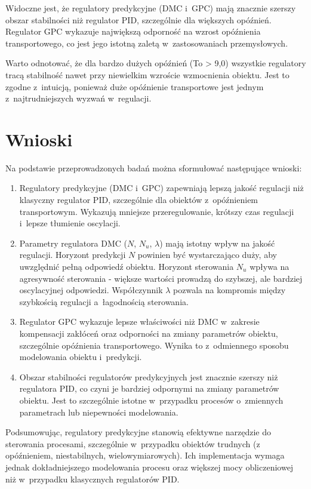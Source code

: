\documentclass[a4paper,titlepage,11pt,floatssmall]{mwrep}
\begin{document}
Widoczne jest, że regulatory predykcyjne (DMC i~GPC) mają znacznie szerszy obszar stabilności niż regulator PID, szczególnie dla większych opóźnień. Regulator GPC wykazuje największą odporność na wzrost opóźnienia transportowego, co jest jego istotną zaletą w~zastosowaniach przemysłowych.

Warto odnotować, że dla bardzo dużych opóźnień (To > 9,0) wszystkie regulatory tracą stabilność nawet przy niewielkim wzroście wzmocnienia obiektu. Jest to zgodne z~intuicją, ponieważ duże opóźnienie transportowe jest jednym z~najtrudniejszych wyzwań w~regulacji.

\chapter{Wnioski}

Na podstawie przeprowadzonych badań można sformułować następujące wnioski:

\begin{enumerate}
    \item Regulatory predykcyjne (DMC i~GPC) zapewniają lepszą jakość regulacji niż klasyczny regulator PID, szczególnie dla obiektów z~opóźnieniem transportowym. Wykazują mniejsze przeregulowanie, krótszy czas regulacji i~lepsze tłumienie oscylacji.

    \item Parametry regulatora DMC ($N$, $N_u$, $\lambda$) mają istotny wpływ na jakość regulacji. Horyzont predykcji $N$ powinien być wystarczająco duży, aby uwzględnić pełną odpowiedź obiektu. Horyzont sterowania $N_u$ wpływa na agresywność sterowania - większe wartości prowadzą do szybszej, ale bardziej oscylacyjnej odpowiedzi. Współczynnik $\lambda$ pozwala na kompromis między szybkością regulacji a~łagodnością sterowania.

    \item Regulator GPC wykazuje lepsze właściwości niż DMC w~zakresie kompensacji zakłóceń oraz odporności na zmiany parametrów obiektu, szczególnie opóźnienia transportowego. Wynika to z~odmiennego sposobu modelowania obiektu i~predykcji.

    \item Obszar stabilności regulatorów predykcyjnych jest znacznie szerszy niż regulatora PID, co czyni je bardziej odpornymi na zmiany parametrów obiektu. Jest to szczególnie istotne w~przypadku procesów o~zmiennych parametrach lub niepewności modelowania.
\end{enumerate}

Podsumowując, regulatory predykcyjne stanowią efektywne narzędzie do sterowania procesami, szczególnie w~przypadku obiektów trudnych (z opóźnieniem, niestabilnych, wielowymiarowych). Ich implementacja wymaga jednak dokładniejszego modelowania procesu oraz większej mocy obliczeniowej niż w~przypadku klasycznych regulatorów PID.
\end{document}
